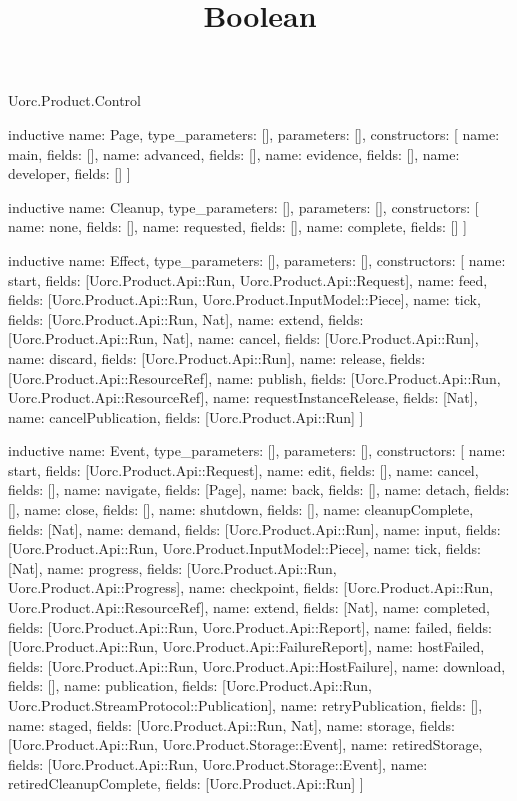 \begin{lexlean}{Uorc.Product.Control}
\title{Boolean}
\begin{semanticmodule}
inductive{
  name: Page,
  type_parameters: [],
  parameters: [],
  constructors: [
    {name: main, fields: []},
    {name: advanced, fields: []},
    {name: evidence, fields: []},
    {name: developer, fields: []}
  ]
}

inductive{
  name: Cleanup,
  type_parameters: [],
  parameters: [],
  constructors: [
    {name: none, fields: []},
    {name: requested, fields: []},
    {name: complete, fields: []}
  ]
}

inductive{
  name: Effect,
  type_parameters: [],
  parameters: [],
  constructors: [
    {name: start, fields: [Uorc.Product.Api::Run, Uorc.Product.Api::Request]},
    {name: feed, fields: [Uorc.Product.Api::Run, Uorc.Product.InputModel::Piece]},
    {name: tick, fields: [Uorc.Product.Api::Run, Nat]},
    {name: extend, fields: [Uorc.Product.Api::Run, Nat]},
    {name: cancel, fields: [Uorc.Product.Api::Run]},
    {name: discard, fields: [Uorc.Product.Api::Run]},
    {name: release, fields: [Uorc.Product.Api::ResourceRef]},
    {name: publish, fields: [Uorc.Product.Api::Run, Uorc.Product.Api::ResourceRef]},
    {name: requestInstanceRelease, fields: [Nat]},
    {name: cancelPublication, fields: [Uorc.Product.Api::Run]}
  ]
}

inductive{
  name: Event,
  type_parameters: [],
  parameters: [],
  constructors: [
    {name: start, fields: [Uorc.Product.Api::Request]},
    {name: edit, fields: []},
    {name: cancel, fields: []},
    {name: navigate, fields: [Page]},
    {name: back, fields: []},
    {name: detach, fields: []},
    {name: close, fields: []},
    {name: shutdown, fields: []},
    {name: cleanupComplete, fields: [Nat]},
    {name: demand, fields: [Uorc.Product.Api::Run]},
    {name: input, fields: [Uorc.Product.Api::Run, Uorc.Product.InputModel::Piece]},
    {name: tick, fields: [Nat]},
    {name: progress, fields: [Uorc.Product.Api::Run, Uorc.Product.Api::Progress]},
    {name: checkpoint, fields: [Uorc.Product.Api::Run, Uorc.Product.Api::ResourceRef]},
    {name: extend, fields: [Nat]},
    {name: completed, fields: [Uorc.Product.Api::Run, Uorc.Product.Api::Report]},
    {name: failed, fields: [Uorc.Product.Api::Run, Uorc.Product.Api::FailureReport]},
    {name: hostFailed, fields: [Uorc.Product.Api::Run, Uorc.Product.Api::HostFailure]},
    {name: download, fields: []},
    {name: publication, fields: [Uorc.Product.Api::Run, Uorc.Product.StreamProtocol::Publication]},
    {name: retryPublication, fields: []},
    {name: staged, fields: [Uorc.Product.Api::Run, Nat]},
    {name: storage, fields: [Uorc.Product.Api::Run, Uorc.Product.Storage::Event]},
    {name: retiredStorage, fields: [Uorc.Product.Api::Run, Uorc.Product.Storage::Event]},
    {name: retiredCleanupComplete, fields: [Uorc.Product.Api::Run]}
  ]
}


\end{semanticmodule}
\end{lexlean}
